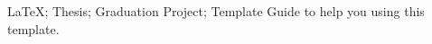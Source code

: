 \makecover

\begin{abstract}{\LaTeX; 论文; 毕业设计; 模板}
讲述如何使用本模板。
\end{abstract}


\begin{abstractEng}{\LaTeX; Thesis; Graduation Project; Template}
Guide to help you using this template.
\end{abstractEng}


\tableofcontents